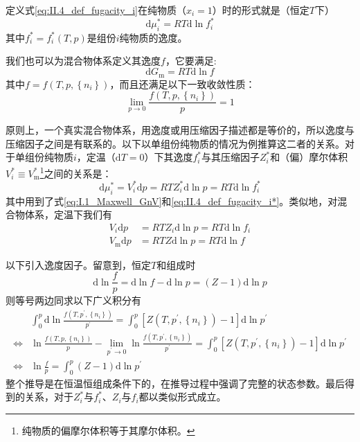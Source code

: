 \documentclass[main.tex]{subfiles}
\begin{document}
定义式\eqref{eq:II.4_def_fugacity_i}在纯物质（$x_i=1$）时的形式就是（恒定$T$下）
\begin{equation}\label{eq:II.4_def_fugacity_i*}
    \mathrm{d}\mu_i^*=RT\mathrm{d}\ln f_i^*
\end{equation}
其中$f_i^*=f_i^*\left(T,p\right)$是组份$i$纯物质的逸度。

我们也可以为混合物体系定义其逸度$f$，它要满足:
\begin{equation}\label{II.4_def_fugacity_f}
    \mathrm{d}G_\text{m}=RT\mathrm{d}\ln f
\end{equation}
其中$f=f\left(T,p,\left\{n_i\right\}\right)$，而且还满足以下一致收敛性质：
\[\lim_{p\to 0}\frac{f\left(T,p,\left\{n_i\right\}\right)}{p}=1\]

原则上，一个真实混合物体系，用逸度或用压缩因子描述都是等价的，所以逸度与压缩因子之间是有联系的。以下以单组份纯物质的情况为例推算这二者的关系。对于单组份纯物质$i$，定温（$\mathrm{d}T=0$）下其逸度$f_i^*$与其压缩因子$Z_i^*$和（偏）摩尔体积$V^*_i\equiv V^*_\text{m}$\footnote{纯物质的偏摩尔体积等于其摩尔体积。}之间的关系是：
\[
    \mathrm{d}\mu_i^*=V_i^*\mathrm{d}p=RTZ_i^*\mathrm{d}\ln p=RT\mathrm{d}\ln f_i^*
\]
其中用到了式\eqref{eq:I.1_Maxwell_GnV}和\eqref{eq:II.4_def_fugacity_i*}。类似地，对混合物体系，定温下我们有
\begin{align*}
    V_i\mathrm{d}p        & =RTZ_i\mathrm{d}\ln p=RT\mathrm{d}\ln f_i \\
    V_\text{m}\mathrm{d}p & =RTZ\mathrm{d}\ln p=RT\mathrm{d}\ln f
\end{align*}

以下引入逸度因子。留意到，恒定$T$和组成时
\[\mathrm{d}\ln\frac{f}{p}=\mathrm{d}\ln f-\mathrm{d}\ln p=\left(Z-1\right)\mathrm{d}\ln p\]
则等号两边同求以下广义积分有
\begin{align*}
                    & \int_0^p\mathrm{d}\ln\frac{f\left(T,p^\prime,\left\{n_i\right\}\right)}{p^\prime}=\int_0^p\left[Z\left(T,p^\prime,\left\{n_i\right\}\right)-1\right]\mathrm{d}\ln p^\prime                                                     \\
    \Leftrightarrow & \ln\frac{f\left(T,p,\left\{n_i\right\}\right)}{p}-\lim_{p^\prime\to 0}\ln\frac{f\left(T,p^\prime,\left\{n_i\right\}\right)}{p^\prime}=\int_0^p\left[Z\left(T,p^\prime,\left\{n_i\right\}\right)-1\right]\mathrm{d}\ln p^\prime \\
    \Leftrightarrow & \ln\frac{f}{p}=\int_0^p\left(Z-1\right)\mathrm{d}\ln p^\prime
\end{align*}
整个推导是在恒温恒组成条件下的，在推导过程中强调了完整的状态参数。最后得到的关系，对于$Z_i^*$与$f_i^*$、$Z_i$与$f_i$都以类似形式成立。
\end{document}
